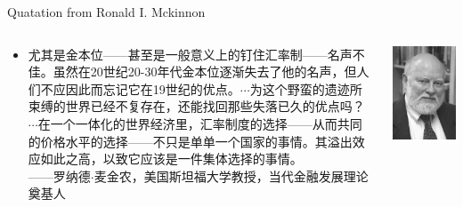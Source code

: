 \documentclass[10pt,hyperref={CJKbookmarks=true},xcolor=dvipsnames,aspectratio=169]{beamer}
\begin{document}
\begin{frame}{Quatation from Ronald I. Mckinnon}

\begin{columns}[onlytextwidth]
	\begin{column}{0.6\textwidth}
		\begin{itemize}
	\item 尤其是金本位——甚至是一般意义上的钉住汇率制——名声不佳。虽然在20世纪20-30年代金本位逐渐失去了他的名声，但人们不应因此而忘记它在19世纪的优点。$\cdots$为这个野蛮的遗迹所束缚的世界已经不复存在，还能找回那些失落已久的优点吗？$\cdots$在一个一体化的世界经济里，汇率制度的选择——从而共同的价格水平的选择——不只是单单一个国家的事情。其溢出效应如此之高，以致它应该是一件集体选择的事情。\\
	——罗纳德$\cdot$麦金农，美国斯坦福大学教授，当代金融发展理论奠基人
		\end{itemize}
	\end{column}
	\begin{column}{0.4\textwidth}
		\centering
		\includegraphics[scale=0.3]{fig/systems/mckinnon}
	\end{column}
\end{columns}
\end{frame}
\end{document}
